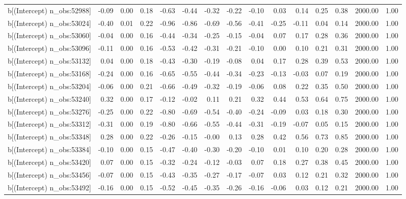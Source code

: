 \begin{table}[ht]
\begin{tabular}{rrrrrrrrrrrrrrr}
  b[(Intercept) n\_obs:52988] & -0.09 & 0.00 & 0.18 & -0.63 & -0.44 & -0.32 & -0.22 & -0.10 & 0.03 & 0.14 & 0.25 & 0.38 & 2000.00 & 1.00 \\ 
  b[(Intercept) n\_obs:53024] & -0.40 & 0.01 & 0.22 & -0.96 & -0.86 & -0.69 & -0.56 & -0.41 & -0.25 & -0.11 & 0.04 & 0.14 & 2000.00 & 1.00 \\ 
  b[(Intercept) n\_obs:53060] & -0.04 & 0.00 & 0.16 & -0.44 & -0.34 & -0.25 & -0.15 & -0.04 & 0.07 & 0.17 & 0.28 & 0.36 & 2000.00 & 1.00 \\ 
  b[(Intercept) n\_obs:53096] & -0.11 & 0.00 & 0.16 & -0.53 & -0.42 & -0.31 & -0.21 & -0.10 & 0.00 & 0.10 & 0.21 & 0.31 & 2000.00 & 1.00 \\ 
  b[(Intercept) n\_obs:53132] & 0.04 & 0.00 & 0.18 & -0.43 & -0.30 & -0.19 & -0.08 & 0.04 & 0.17 & 0.28 & 0.39 & 0.53 & 2000.00 & 1.00 \\ 
  b[(Intercept) n\_obs:53168] & -0.24 & 0.00 & 0.16 & -0.65 & -0.55 & -0.44 & -0.34 & -0.23 & -0.13 & -0.03 & 0.07 & 0.19 & 2000.00 & 1.00 \\ 
  b[(Intercept) n\_obs:53204] & -0.06 & 0.00 & 0.21 & -0.66 & -0.49 & -0.32 & -0.19 & -0.06 & 0.08 & 0.22 & 0.35 & 0.50 & 2000.00 & 1.00 \\ 
  b[(Intercept) n\_obs:53240] & 0.32 & 0.00 & 0.17 & -0.12 & -0.02 & 0.11 & 0.21 & 0.32 & 0.44 & 0.53 & 0.64 & 0.75 & 2000.00 & 1.00 \\ 
  b[(Intercept) n\_obs:53276] & -0.25 & 0.00 & 0.22 & -0.80 & -0.69 & -0.54 & -0.40 & -0.24 & -0.09 & 0.03 & 0.18 & 0.30 & 2000.00 & 1.00 \\ 
  b[(Intercept) n\_obs:53312] & -0.31 & 0.00 & 0.19 & -0.80 & -0.66 & -0.55 & -0.44 & -0.31 & -0.19 & -0.07 & 0.05 & 0.15 & 2000.00 & 1.00 \\ 
  b[(Intercept) n\_obs:53348] & 0.28 & 0.00 & 0.22 & -0.26 & -0.15 & -0.00 & 0.13 & 0.28 & 0.42 & 0.56 & 0.73 & 0.85 & 2000.00 & 1.00 \\ 
  b[(Intercept) n\_obs:53384] & -0.10 & 0.00 & 0.15 & -0.47 & -0.40 & -0.30 & -0.20 & -0.10 & 0.01 & 0.10 & 0.20 & 0.28 & 2000.00 & 1.00 \\ 
  b[(Intercept) n\_obs:53420] & 0.07 & 0.00 & 0.15 & -0.32 & -0.24 & -0.12 & -0.03 & 0.07 & 0.18 & 0.27 & 0.38 & 0.45 & 2000.00 & 1.00 \\ 
  b[(Intercept) n\_obs:53456] & -0.07 & 0.00 & 0.15 & -0.43 & -0.35 & -0.27 & -0.17 & -0.07 & 0.03 & 0.12 & 0.21 & 0.32 & 2000.00 & 1.00 \\ 
  b[(Intercept) n\_obs:53492] & -0.16 & 0.00 & 0.15 & -0.52 & -0.45 & -0.35 & -0.26 & -0.16 & -0.06 & 0.03 & 0.12 & 0.21 & 2000.00 & 1.00 \\ 

\end{tabular}
\end{table}
